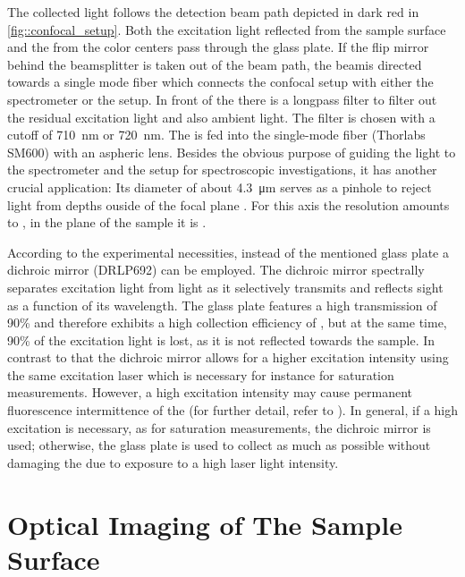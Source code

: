 		The collected light follows the detection beam path depicted in dark red in \autoref{fig::confocal_setup}.
		Both the excitation light reflected from the sample surface and the \fl from the color centers pass through the glass plate.
		If the flip mirror behind the beamsplitter is taken out of the beam path, the beamis directed towards a single mode fiber which connects the confocal setup with either the spectrometer or the \hbt setup.
		In front of the \smf there is a longpass filter to filter out the residual excitation light and also ambient light.
		The filter is chosen with a cutoff \wl of \SI{710}{\nm} or \SI{720}{\nm}.
		The \fl is fed into the single-mode fiber (Thorlabs SM600) with an aspheric lens.
		Besides the obvious purpose of guiding the \pl light to the spectrometer and the \HBT setup for spectroscopic investigations, it has another crucial application:
		Its diameter of about \SI{4.3}{\micro\meter} serves as a pinhole to reject \pl light from depths ouside of the focal plane \cite{Santori2010}.
		For this axis the resolution amounts to , in the plane of the sample it is .

		According to the experimental necessities, instead of the mentioned glass plate a dichroic mirror (DRLP692) can be employed.
		The dichroic mirror spectrally separates excitation light from \pl light as it selectively transmits and reflects sight as a function of its wavelength.
		The glass plate features a high transmission of 90\% and therefore exhibits a high collection efficiency of \fl, but at the same time, 90\% of the excitation light is lost, as it is not reflected towards the sample.
		In contrast to that the dichroic mirror allows for a higher excitation intensity using the same excitation laser which is necessary for instance for saturation measurements.
		However, a high excitation intensity may cause permanent fluorescence intermittence of the \sivs (for further detail, refer to ).
		In general, if a high excitation is necessary, as for saturation measurements, the dichroic mirror is used; otherwise, the glass plate is used to collect as much \fl as possible without damaging the \sivs due to exposure to a high laser light intensity.

	\section[Optical Imaging]{Optical Imaging of The Sample Surface} \label{sec::methods_optical}

